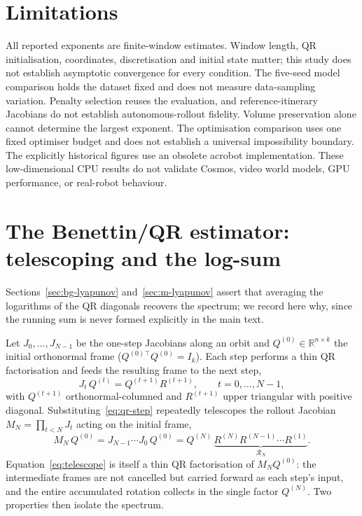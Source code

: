 \documentclass[11pt]{article}
\begin{document}
\section{Limitations}\label{sec:limitations}
All reported exponents are finite-window estimates. Window length, QR initialisation,
coordinates, discretisation and initial state matter; this study does not establish
asymptotic convergence for every condition. The five-seed model comparison holds the
dataset fixed and does not measure data-sampling variation. Penalty selection reuses
the evaluation, and reference-itinerary Jacobians do not establish autonomous-rollout
fidelity. Volume preservation alone cannot determine the largest exponent.
The optimisation comparison uses one fixed optimiser budget and does not establish a
universal impossibility boundary. The explicitly historical figures use an obsolete
acrobot implementation. These low-dimensional CPU results do not validate Cosmos,
video world models, GPU performance, or real-robot behaviour.

\appendix

\section{The Benettin/QR estimator: telescoping and the log-sum}\label{app:qr}

Sections~\ref{sec:bg-lyapunov} and~\ref{sec:m-lyapunov} assert that averaging the
logarithms of the QR diagonals recovers the spectrum; we record here why, since the
running sum is never formed explicitly in the main text.

Let $J_0,\dots,J_{N-1}$ be the one-step Jacobians along an orbit and $Q^{(0)}\in
\mathbb{R}^{n\times k}$ the initial orthonormal frame ($Q^{(0)\top}Q^{(0)}=I_k$). Each
step performs a thin QR factorisation and feeds the resulting frame to the next step,
\begin{equation}
J_t\,Q^{(t)} = Q^{(t+1)}R^{(t+1)},\qquad t=0,\dots,N-1,
\label{eq:qr-step}
\end{equation}
with $Q^{(t+1)}$ orthonormal-columned and $R^{(t+1)}$ upper triangular with positive
diagonal. Substituting~\eqref{eq:qr-step} repeatedly telescopes the rollout Jacobian
$M_N=\prod_{t<N}J_t$ acting on the initial frame,
\begin{equation}
M_N\,Q^{(0)} = J_{N-1}\cdots J_0\,Q^{(0)}
= Q^{(N)}\,\underbrace{R^{(N)}R^{(N-1)}\cdots R^{(1)}}_{\displaystyle \mathcal{R}_N}.
\label{eq:telescope}
\end{equation}
Equation~\eqref{eq:telescope} is itself a thin QR factorisation of $M_N Q^{(0)}$: the
intermediate frames are not cancelled but carried forward as each step's input, and the
entire accumulated rotation collects in the single factor $Q^{(N)}$. Two properties then
isolate the spectrum.
\end{document}
